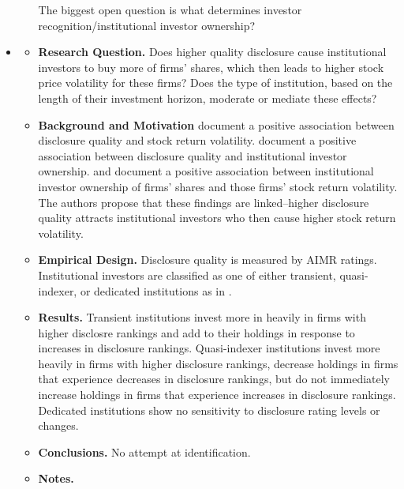 \documentclass[12pt, letterpaper]{article}
\begin{document}
\begin{itemize}
\begin{itemize}
The biggest open question is what determines investor recognition/institutional investor ownership?
    \end{itemize}
\item \cite{busheenoe2000}
   \begin{itemize} 
    \item \textbf{Research Question.} Does higher quality disclosure cause institutional investors to buy more of firms' shares, which then leads to higher stock price volatility for these firms? Does the type of institution, based on the length of their investment horizon, moderate or mediate these effects?

    \item \textbf{Background and Motivation} \cite{langlundholm1993} document a positive association between disclosure quality and stock return volatility. \cite{healyetal1999} document a positive association between disclosure quality and institutional investor ownership. \cite{sias1996} and \cite{potter1992} document a positive association between institutional investor ownership of firms' shares and those firms' stock return volatility. The authors propose that these findings are linked--higher disclosure quality attracts institutional investors who then cause higher stock return volatility.

    \item \textbf{Empirical Design.} Disclosure quality is measured by AIMR ratings. Institutional investors are classified as one of either transient, quasi-indexer, or dedicated institutions as in \cite{bushee1998}.

    \item \textbf{Results.} Transient institutions invest more in heavily in firms with higher disclosre rankings and add to their holdings in response to increases in disclosure rankings. Quasi-indexer institutions invest more heavily in firms with higher disclosure rankings, decrease holdings in firms that experience decreases in disclosure rankings, but do not immediately increase holdings in firms that experience increases in disclosure rankings. Dedicated institutions show no sensitivity to disclosure rating levels or changes.

    \item \textbf{Conclusions.} No attempt at identification.

    \item \textbf{Notes.} 
    \end{itemize}

\end{itemize}
\end{document}
